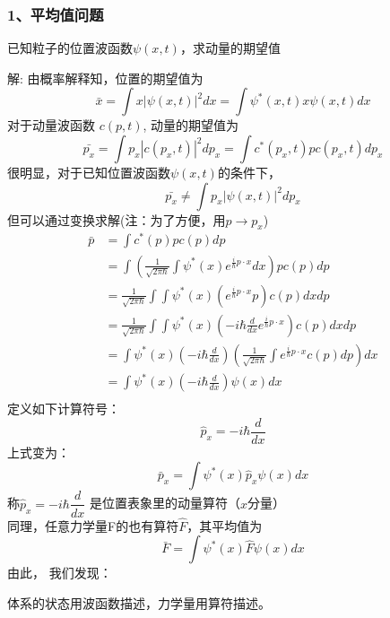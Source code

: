 \begin{frame} [allowframebreaks=]
    \frametitle{1、平均值问题}
    \begin{exampleblock}{}
        已知粒子的位置波函数$\psi(x,t)$，求动量的期望值   
    \end{exampleblock}
    \alert{解:} 由概率解释知，位置的期望值为
    \begin{equation*}
        \bar{x}=\int x|\psi(x, t)|^{2} d x=\int \psi^{*}(x, t) x \psi(x, t) d x
    \end{equation*}
    对于动量波函数 $c(p,t)$, 动量的期望值为
    \begin{equation*}
        \bar{p_x}=\int p_x|c(p_x, t)|^{2} d p_x=\int c^{*}(p_x, t) p c(p_x, t) d p_x
    \end{equation*}
    很明显，对于已知位置波函数$\psi(x,t)$的条件下，
    \begin{equation*}
        \bar{p_x}\neq\int p_x|\psi(x, t)|^{2} d p_x
    \end{equation*}
    但可以通过变换求解(注：为了方便，用$p \to p_x$)
    \begin{equation*}
        \begin{split}
            \bar{p}&=\int c^{*}(p) p c(p) d p \\  
            &=\int (\frac{1}{\sqrt{2 \pi \hbar}} \int \psi^{*}(x) e^{\frac{i}{\hbar} p\cdot x} d x) p c\left(p\right) d p \\
            &=\frac{1}{\sqrt{2 \pi \hbar}} \int \int \psi^{*}(x) (e^{\frac{i}{\hbar} p\cdot x}  p) c\left(p\right) d xd p \\
            &=\frac{1}{\sqrt{2 \pi \hbar}} \int \int \psi^{*}(x) (-i\hbar\frac{d}{d x} e^{\frac{i}{\hbar} p\cdot x}) c(p) d xd p \\
            &=\int \psi^{*}(x) (-i\hbar\frac{d}{d x}) (\frac{1}{\sqrt{2 \pi \hbar}} \int e^{\frac{i}{\hbar} p\cdot x} c(p) d p)  d x\\
            &=\int \psi^{*}(x) (-i\hbar\frac{d}{d x}) \psi(x)  d x\\
         \end{split}
    \end{equation*}  
    定义如下计算符号：
    $$ \hat{p}_x= -i\hbar\frac{d}{d x} $$ 
    上式变为：         
    $$\bar{p}_x=\int \psi^{*}(x) \hat{p}_x \psi(x) d x $$
    称$ \hat{p}_x= -i\hbar\dfrac{d}{d x} $ 是位置表象里的动量算符（$x$分量）\\
    同理，任意力学量F的也有算符$\hat{F}$，其平均值为\\
    $$\bar{F}=\int \psi^{*}(x) \hat{F} \psi(x) d x $$
    由此， 我们发现：
    \begin{tcolorbox}[colback=yellow!10,colframe=red!75!black,title=Basic assumption 3/5]
    体系的状态用波函数描述，力学量用算符描述。
    \end{tcolorbox}
\end{frame} 

